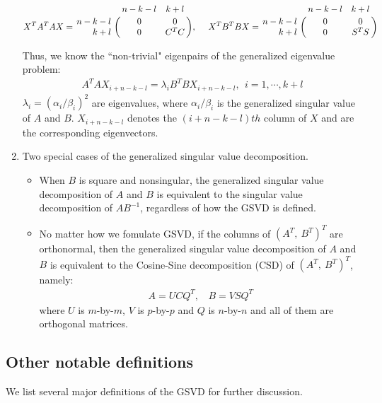 \begin{enumerate}
            \begin{displaymath}
                X^TA^TAX = \bordermatrix{ & n-k-l & k+l   \cr
                \hfill n-k-l & 0 & 0 \cr
                \hfill k+l & 0 & C^TC}, \  \ \ \
                X^TB^TBX = \bordermatrix{ & n-k-l & k+l   \cr
                \hfill n-k-l & 0 & 0 \cr
                \hfill k+l & 0 & S^TS}
            \end{displaymath}
            
            Thus, we know the ``non-trivial" eigenpairs of the generalized eigenvalue problem:
            \begin{align*}
                A^TAX_{i+n-k-l} = \lambda_{i} B^TBX_{i+n-k-l}, \ \ i = 1, \cdots, k+l
            \end{align*}
            $\lambda_i = (\alpha_i/\beta_i)^2$ are eigenvalues, where $\alpha_i/\beta_i$ is the generalized singular value of $A$ and $B$. $X_{i+n-k-l}$ denotes the $(i+n-k-l)th$ column of $X$ and are the corresponding eigenvectors.
            
        \item Two special cases of the generalized singular value decomposition.
            \begin{itemize}
                \item When $B$ is square and nonsingular, the generalized singular value decomposition of $A$ and $B$ is equivalent to the singular value decomposition of $AB^{-1}$, regardless of how the GSVD is defined.
                
                \item No matter how we fomulate GSVD, if the columns of $(A^T, \ B^T)^T$ are orthonormal, then the generalized singular value decomposition of $A$ and $B$ is equivalent to the Cosine-Sine decomposition (CSD) of $(A^T, \ B^T)^T$, namely:
                \begin{align}
                    A = UCQ^T, \ \ \ \ B = VSQ^T
                \end{align}
                where $U$ is $m$-by-$m$, $V$ is $p$-by-$p$ and $Q$ is $n$-by-$n$ and all of them are orthogonal matrices.
            \end{itemize}
     \end{enumerate}
     
     \subsection{Other notable definitions} \label{other-defs}
        We list several major definitions of the GSVD for further discussion.
        
